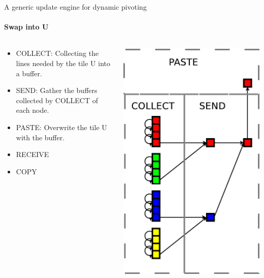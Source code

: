 \begin{frame}{A generic update engine for dynamic pivoting}
\framesubtitle{Swap into U}
\begin{columns}
\begin{column}{.60\textwidth}
\begin{itemize}
\item COLLECT: Collecting the lines needed by the tile U into a buffer.
\item SEND: Gather the buffers collected by COLLECT of each node.
\item PASTE: Overwrite the tile U with the buffer.
\item RECEIVE
\item COPY
\end{itemize}
\end{column}
\hfill
\begin{column}{.40\textwidth}
\begin{center}
\includegraphics[scale=0.3]{collect.pdf}
\end{center}
\end{column}
\end{columns}
\end{frame}

